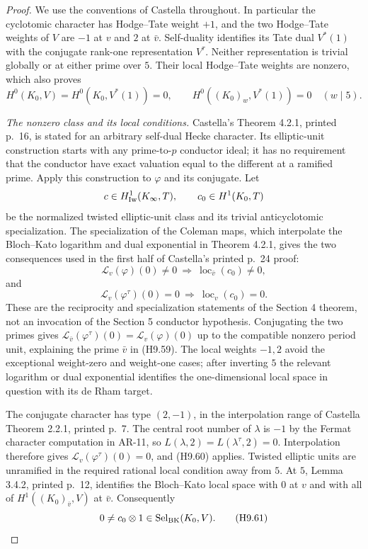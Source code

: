 \documentclass[11pt,a4paper]{article}
\begin{document}
\begin{proof}
We use the conventions of Castella throughout. In particular the
cyclotomic character has Hodge--Tate weight $+1$, and the two
Hodge--Tate weights of $V$ are $-1$ at $v$ and $2$ at $\bar v$.
Self-duality identifies its Tate dual $V^*(1)$ with the conjugate
rank-one representation $V^\tau$. Neither representation is
trivial globally or at either prime over $5$. Their local
Hodge--Tate weights are nonzero, which also proves
\[
 H^0(K_0,V)=H^0(K_0,V^*(1))=0,
 \qquad H^0((K_0)_w,V^*(1))=0\quad(w\mid5).                \tag{H9.58}
\]

\emph{The nonzero class and its local conditions.}
Castella's Theorem 4.2.1, printed p.~16, is stated for an arbitrary
self-dual Hecke character. Its elliptic-unit construction starts
with any prime-to-$p$ conductor ideal; it has no requirement that
the conductor have exact valuation equal to the different at a
ramified prime. Apply this construction to $\varphi$ and its
conjugate. Let
\[
 c\in H^1_{\rm Iw}(K_\infty,T),\qquad
 c_0\in H^1(K_0,T)
\]
be the normalized twisted elliptic-unit class and its trivial
anticyclotomic specialization. The specialization of the Coleman
maps, which interpolate the Bloch--Kato logarithm and dual
exponential in Theorem 4.2.1, gives the two consequences used in
the first half of Castella's printed p.~24 proof:
\[
 \mathcal L_v(\varphi)(0)\ne0
       \ \Longrightarrow\ \operatorname{loc}_{\bar v}(c_0)\ne0,
                                                               \tag{H9.59}
\]
and
\[
 \mathcal L_v(\varphi^\tau)(0)=0
       \ \Longrightarrow\ \operatorname{loc}_{v}(c_0)=0.
                                                               \tag{H9.60}
\]
These are the reciprocity and specialization statements of the
Section 4 theorem, not an invocation of the Section 5 conductor
hypothesis. Conjugating the two primes gives
$\mathcal L_{\bar v}(\varphi^\tau)(0)=\mathcal L_v(\varphi)(0)$
up to the compatible nonzero period unit, explaining the prime
$\bar v$ in (H9.59). The local weights $-1,2$ avoid the exceptional
weight-zero and weight-one cases; after inverting $5$ the relevant
logarithm or dual exponential identifies the one-dimensional local
space in question with its de Rham target.

The conjugate character has type $(2,-1)$, in the interpolation
range of Castella Theorem 2.2.1, printed p.~7. The central root
number of $\lambda$ is $-1$ by the Fermat character computation
in AR-11, so $L(\lambda,2)=L(\lambda^\tau,2)=0$.
Interpolation therefore gives
$\mathcal L_v(\varphi^\tau)(0)=0$, and (H9.60) applies.
Twisted elliptic units are unramified in the required rational
local condition away from $5$. At $5$, Lemma 3.4.2, printed p.~12,
identifies the Bloch--Kato local space with $0$ at $v$ and with
all of $H^1((K_0)_{\bar v},V)$ at $\bar v$. Consequently
\[
       0\ne c_0\otimes1
             \in\operatorname{Sel}_{\rm BK}(K_0,V).        \tag{H9.61}
\]


\end{proof}
\end{document}
